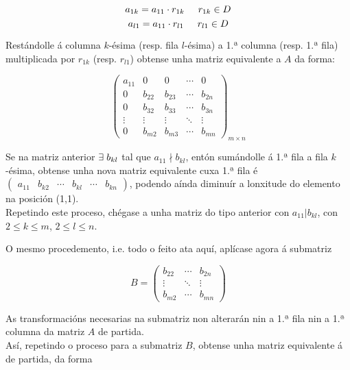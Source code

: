\documentclass[twoside]{report}
\theoremstyle{mystyle}
\begin{document}
\begin{enumerate}
    $$
    a_{1k} = a_{11} \cdot r_{1k} \hspace{5mm} r_{1k} \in D
    $$
    $$
    a_{l1} = a_{11} \cdot r_{l1} \hspace{5mm} r_{l1} \in D
    $$
    
    Restándolle á columna $k$-ésima (resp. fila $l$-ésima) a 1.ª columna (resp. 1.ª fila) multiplicada por $r_{1k}$ (resp. $r_{l1}$) obtense unha matriz equivalente a $A$ da forma:
    
    $$
    \begin{pmatrix}
    a_{11} & 0 & 0 & \cdots & 0 \\
    0 & b_{22} & b_{23} & \cdots & b_{2n} \\
    0 & b_{32} & b_{33} & \cdots & b_{3n} \\
    \vdots & \vdots & \vdots & \ddots & \vdots \\
    0 & b_{m2} & b_{m3} & \cdots & b_{mn}
    \end{pmatrix}_{m \times n}
    $$
    
    Se na matriz anterior $\exists \hspace{1mm} b_{kl}$ tal que $a_{11} \nmid b_{kl}$, entón sumándolle á 1.ª fila a fila $k$-ésima, obtense unha nova matriz equivalente cuxa 1.ª fila é $\begin{pmatrix} a_{11} & b_{k2} & \cdots & b_{kl} & \cdots & b_{kn} \end{pmatrix}$, podendo aínda diminuír a lonxitude do elemento na posición (1,1).\\
    
    Repetindo este proceso, chégase a unha matriz do tipo anterior con $a_{11} | b_{kl}$, con $2 \leq k \leq m$, $2 \leq l \leq n$.\\
    
\end{enumerate}

\noindent O mesmo procedemento, i.e. todo o feito ata aquí, aplícase agora á submatriz

$$
B = \begin{pmatrix}
b_{22} & \cdots & b_{2n}\\
\vdots & \ddots & \vdots \\
b_{m2} & \cdots & b_{mn}
\end{pmatrix}
$$

\noindent As transformacións necesarias na submatriz non alterarán nin a 1.ª fila nin a 1.ª columna da matriz $A$ de partida.\\

\noindent Así, repetindo o proceso para a submatriz $B$, obtense unha matriz equivalente á de partida, da forma
\end{document}
